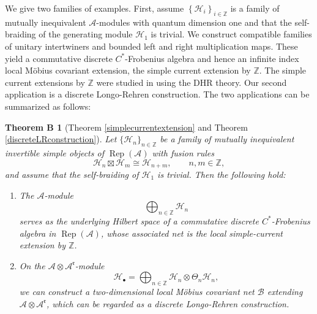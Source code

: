 \documentclass{article}
\newtheorem*{theoremB}{Theorem B}
\newcommand{\hilb}{\mathcal{H}}
\newcommand{\B}{\mathcal{B}}
\newcommand{\A}{\mathcal{A}}
\newcommand{\Z}{\mathbb{Z}}
\begin{document}
We give two families of examples. First, 
assume $\left\{ \hilb_i\right\}_{i\in\Z}$ is a family of mutually inequivalent $\A$-modules with quantum dimension one and that the self-braiding 
of the generating module $\hilb_1$ is trivial. We construct compatible families of unitary intertwiners and bounded left and right multiplication maps. These yield a commutative discrete $C^*$-Frobenius algebra and hence an infinite index local M\"{o}bius covariant extension, the simple current extension by $\Z$.
The simple current extensions by $\Z$ were studied in 
\cite[Section 3]{staszkiewicz1995lokale} using the DHR theory. 
Our second application is a discrete Longo-Rehren construction.
The two applications can be summarized as follows:

\begin{theoremB}[Theorem \ref{simplecurrentextension} and Theorem \ref{discreteLRconstruction}]
Let \(\{\mathcal H_n\}_{n\in\mathbb Z}\) be a family of mutually
inequivalent invertible simple objects of \(\operatorname{Rep}(\mathcal A)\)
with fusion rules
\[
    \mathcal H_n \boxtimes \mathcal H_m
    \cong
    \mathcal H_{n+m},
    \qquad n,m\in\mathbb Z,
\]
and assume that the self-braiding of \(\mathcal H_1\) is trivial.
Then the following hold:

\begin{enumerate}
    \item
    The $\A$-module
    \[
        \bigoplus_{n\in\mathbb Z}\mathcal H_n
    \]
    serves as the underlying Hilbert space of  a commutative discrete \(C^*\)-Frobenius algebra in $\operatorname{Rep}(\A)$, whose
    associated net is the local simple-current extension by
    \(\mathbb Z\).

    \item
    On the $\A\otimes \A^{\mathfrak{r}}$-module
    \[
        \mathcal H_\bullet
        =
        \bigoplus_{n\in\mathbb Z}
        \mathcal H_n \otimes \Theta_n \mathcal H_n ,
    \]
    we can construct a two-dimensional local M\"{o}bius covariant net $\B$ extending $\A\otimes \A^{\mathfrak{r}}$, which can be regarded as a
    discrete Longo-Rehren construction.
\end{enumerate}
\end{theoremB}
\end{document}
